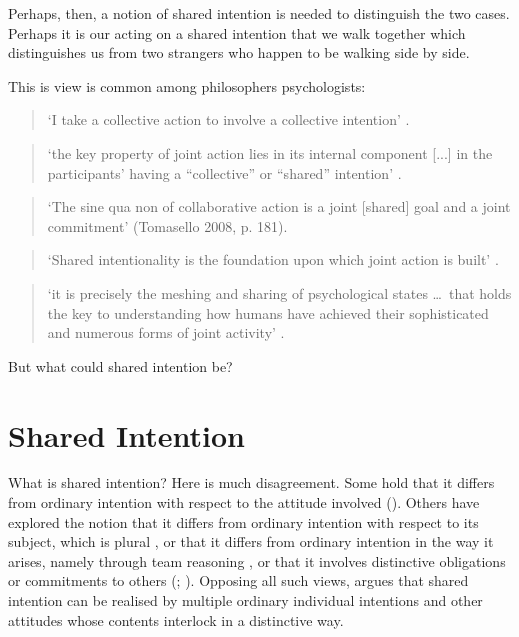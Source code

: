 \documentclass[12pt,\papersize]{extarticle}
\begin{document}
Perhaps, then, a notion of shared intention is needed to distinguish the two cases.  
Perhaps it is our acting on a shared intention that we walk together which distinguishes us from two strangers who happen to be walking side by side.

This is view is common among philosophers psychologists:
%
\begin{quote}
	`I take a collective action to involve a collective intention'  \citep[p.\ 5]{Gilbert:2006wr}. 
\end{quote}	
%
\begin{quote}
`the key property of joint action lies in its internal component [...] in the participants' having a ``collective'' or ``shared'' intention' \citep[pp.\ 444-5]{alonso_shared_2009}.
\end{quote}
%
\begin{quote} 
`The sine qua non of collaborative action is a joint [shared] goal and a joint commitment’ 
(Tomasello 2008, p. 181).
\end{quote} 
%
\begin{quote}
`Shared intentionality is the foundation upon which joint action is built' \citep[p.\ 381]{Carpenter:2009wq}.
\end{quote}
%
\begin{quote}
`it is precisely the meshing and sharing of psychological states \ldots \ that holds the key to understanding how humans have achieved their sophisticated and numerous forms of joint activity'
\citep[p.\ 369]{Call:2009fk}.
\end{quote}
%
But what could shared intention be?



\section{Shared Intention}
What is shared intention?
Here is much disagreement.
Some hold that it differs from
ordinary intention with respect to the attitude involved (\citealp{Searle:1990em}). 
Others have explored the notion that it differs from ordinary intention with respect to its subject, which is plural \citep{Gilbert:1992rs,helm_plural_2008}, 
or that it differs from ordinary intention in the way it arises, namely through team reasoning \citep{Gold:2007zd}, 
or that it involves distinctive obligations or commitments to others (\citealp{Gilbert:1992rs}; \citealp{Roth:2004ki}).
Opposing all such views, \citet{Bratman:1992mi,Bratman:2009lv} argues that shared intention can be realised by multiple ordinary individual intentions and other attitudes whose contents interlock in a distinctive way. 
\end{document}
